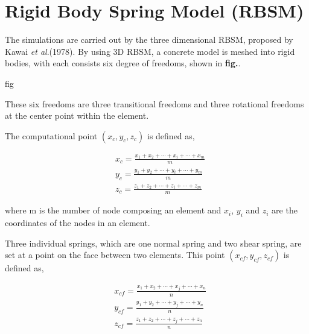 


\section{Rigid Body Spring Model (RBSM)}

The simulations are carried out by the three dimensional RBSM, proposed by Kawai \textit{et al}.(1978). By using 3D RBSM, a concrete model is meshed into rigid bodies, with each consists six degree of freedoms, shown in \textbf{fig.}.

fig

These six freedoms are three transitional freedoms and three rotational freedoms at the center point within the element.

The computational point $(x_c, y_c, z_c)$ is defined as,

\begin{equation}
  \begin{aligned}
  &x_c=\frac{x_1 + x_2 + \cdots + x_i + \cdots + x_m}{m} \\
  &y_c=\frac{y_1 + y_2 + \cdots + y_i + \cdots + y_m}{m} \\
  &z_c=\frac{z_1 + z_2 + \cdots + z_i + \cdots + z_m}{m}
  \end{aligned}
\end{equation}

where m is the number of node composing an element and $x_i$, $y_i$ and $z_i$ are the coordinates of the nodes in an element.

Three individual springs, which are one normal spring and two shear spring, are set at a point on the face between two elements. This point $(x_{cf}, y_{cf}, z_{cf})$ is defined as,

\begin{equation}
  \begin{aligned}
  &x_{cf}=\frac{x_1 + x_2 + \cdots + x_j + \cdots + x_n}{n} \\
  &y_{cf}=\frac{y_1 + y_2 + \cdots + y_j + \cdots + y_n}{n} \\
  &z_{cf}=\frac{z_1 + z_2 + \cdots + z_j + \cdots + z_n}{n}
  \end{aligned}
\end{equation}

